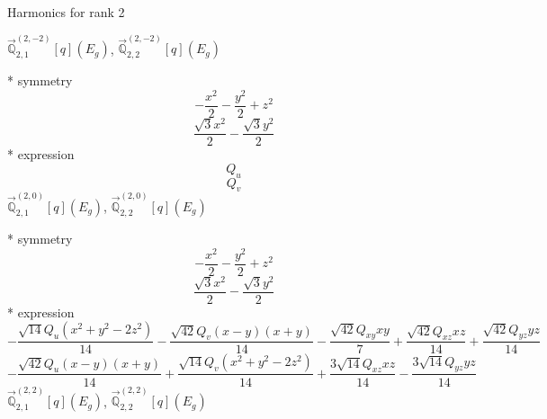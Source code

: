 \documentclass[fleqn,8pt]{jsarticle}
\begin{document}
\noindent * Harmonics for rank 2

\noindent\quad $\vec{\mathbb{Q}}_{2,1}^{(2,-2)}[q](E_{g})$, $\vec{\mathbb{Q}}_{2,2}^{(2,-2)}[q](E_{g})$

\noindent\quad ** symmetry
\begin{dmath*}
- \frac{x^{2}}{2} - \frac{y^{2}}{2} + z^{2}
\end{dmath*}
\begin{dmath*}
\frac{\sqrt{3} x^{2}}{2} - \frac{\sqrt{3} y^{2}}{2}
\end{dmath*}
\noindent\quad ** expression
\begin{dmath*}
Q_{u}
\end{dmath*}
\begin{dmath*}
Q_{v}
\end{dmath*}
\noindent\quad $\vec{\mathbb{Q}}_{2,1}^{(2,0)}[q](E_{g})$, $\vec{\mathbb{Q}}_{2,2}^{(2,0)}[q](E_{g})$

\noindent\quad ** symmetry
\begin{dmath*}
- \frac{x^{2}}{2} - \frac{y^{2}}{2} + z^{2}
\end{dmath*}
\begin{dmath*}
\frac{\sqrt{3} x^{2}}{2} - \frac{\sqrt{3} y^{2}}{2}
\end{dmath*}
\noindent\quad ** expression
\begin{dmath*}
- \frac{\sqrt{14} Q_{u} \left(x^{2} + y^{2} - 2 z^{2}\right)}{14} - \frac{\sqrt{42} Q_{v} \left(x - y\right) \left(x + y\right)}{14} - \frac{\sqrt{42} Q_{xy} x y}{7} + \frac{\sqrt{42} Q_{xz} x z}{14} + \frac{\sqrt{42} Q_{yz} y z}{14}
\end{dmath*}
\begin{dmath*}
- \frac{\sqrt{42} Q_{u} \left(x - y\right) \left(x + y\right)}{14} + \frac{\sqrt{14} Q_{v} \left(x^{2} + y^{2} - 2 z^{2}\right)}{14} + \frac{3 \sqrt{14} Q_{xz} x z}{14} - \frac{3 \sqrt{14} Q_{yz} y z}{14}
\end{dmath*}
\noindent\quad $\vec{\mathbb{Q}}_{2,1}^{(2,2)}[q](E_{g})$, $\vec{\mathbb{Q}}_{2,2}^{(2,2)}[q](E_{g})$
\end{document}
